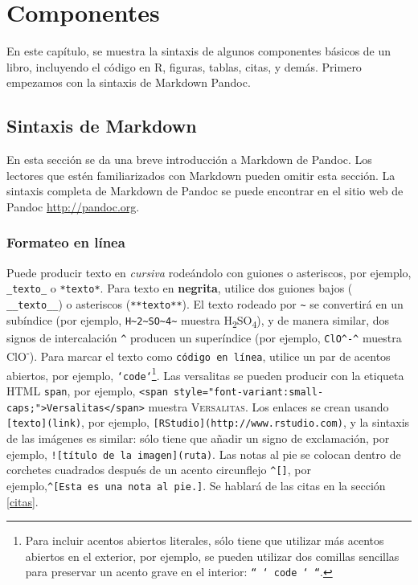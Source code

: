 \documentclass[12pt,]{krantz}
\theoremstyle{definition}
\theoremstyle{definition}
\theoremstyle{remark}
\begin{document}
\chapter{Componentes}\label{componentes}

En este capítulo, se muestra la sintaxis de algunos componentes básicos
de un libro, incluyendo el código en R, figuras, tablas, citas, y demás.
Primero empezamos con la sintaxis de Markdown Pandoc.

\section{Sintaxis de Markdown}\label{sintaxis-de-markdown}

En esta sección se da una breve introducción a Markdown de Pandoc. Los
lectores que estén familiarizados con Markdown pueden omitir esta
sección. La sintaxis completa de Markdown de Pandoc se puede encontrar
en el sitio web de Pandoc \url{http://pandoc.org}.

\subsection{Formateo en línea}\label{formateo-en-linea}

Puede producir texto en \emph{cursiva} rodeándolo con guiones o
asteriscos, por ejemplo, \texttt{\_texto\_} o \texttt{*texto*}. Para
texto en \textbf{negrita}, utilice dos guiones bajos (
\texttt{\_\_texto\_\_}) o asteriscos (\texttt{**texto**}). El texto
rodeado por \texttt{\textasciitilde{}} se convertirá en un subíndice
(por ejemplo,
\texttt{H\textasciitilde{}2\textasciitilde{}SO\textasciitilde{}4\textasciitilde{}}
muestra H\textsubscript{2}SO\textsubscript{4}), y de manera similar, dos
signos de intercalación \texttt{\^{}} producen un superíndice (por
ejemplo, \texttt{ClO\^{}-\^{}} muestra ClO\textsuperscript{-}). Para
marcar el texto como \texttt{código\ en\ línea}, utilice un par de
acentos abiertos, por ejemplo, \texttt{`code`}\footnote{Para incluir
  acentos abiertos literales, sólo tiene que utilizar más acentos
  abiertos en el exterior, por ejemplo, se pueden utilizar dos comillas
  sencillas para preservar un acento grave en el interior:
  \texttt{``\ `\ code\ `\ ``}.}. Las versalitas se pueden producir con
la etiqueta HTML \texttt{span}, por ejemplo,
\texttt{\textless{}span\ style="font-variant:small-caps;"\textgreater{}Versalitas\textless{}/span\textgreater{}}
muestra \textsc{Versalitas}. Los enlaces se crean usando
\texttt{{[}texto{]}(link)}, por ejemplo,
\texttt{{[}RStudio{]}(http://www.rstudio.com)}, y la sintaxis de las
imágenes es similar: sólo tiene que añadir un signo de exclamación, por
ejemplo, \texttt{!{[}título\ de\ la\ imagen{]}(ruta)}. Las notas al pie
se colocan dentro de corchetes cuadrados después de un acento
circunflejo \texttt{\^{}{[}{]}}, por
ejemplo,\texttt{\^{}{[}Esta\ es\ una\ nota\ al\ pie.{]}}. Se hablará de
las citas en la sección \ref{citas}.
\end{document}
